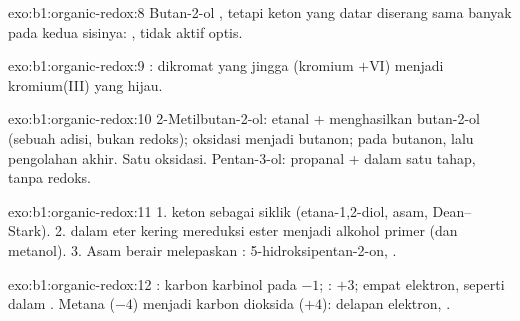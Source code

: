 \begin{solution}{exo:b1:organic-redox:8}
Butan-2-ol , tetapi keton yang datar diserang sama banyak pada kedua
sisinya: , tidak aktif optis.
\end{solution}

\begin{solution}{exo:b1:organic-redox:9}
: dikromat
yang jingga (kromium $+$VI) menjadi kromium(III) yang hijau.
\end{solution}

\begin{solution}{exo:b1:organic-redox:10}
2-Metilbutan-2-ol: etanal +  menghasilkan butan-2-ol
(sebuah adisi, bukan redoks); oksidasi menjadi butanon;  pada
butanon, lalu pengolahan akhir. Satu oksidasi. Pentan-3-ol: propanal +
 dalam satu tahap, tanpa redoks.
\end{solution}

\begin{solution}{exo:b1:organic-redox:11}
1.  keton sebagai  siklik (etana-1,2-diol, asam,
Dean--Stark). 2.  dalam eter kering mereduksi ester menjadi
alkohol primer (dan metanol). 3. Asam berair melepaskan :
5-hidroksipentan-2-on, .
\end{solution}

\begin{solution}{exo:b1:organic-redox:12}
: karbon karbinol pada $-1$; : $+3$; empat elektron,
seperti dalam . Metana ($-4$)
menjadi karbon dioksida ($+4$): delapan elektron,
.
\end{solution}

